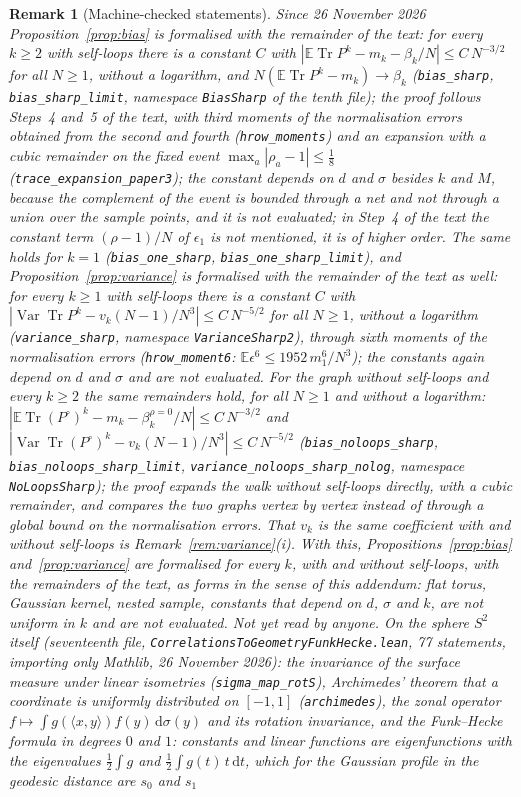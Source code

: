 \documentclass[11pt,a4paper]{article}
\theoremstyle{stmt}
\theoremstyle{defn}
\theoremstyle{rmk}
\newtheorem{remark}[theorem]{Remark}
\numberwithin{equation}{section}
\DeclareMathOperator{\Tr}{Tr}
\newcommand{\dd}{\mathrm{d}}
\begin{document}
{\begin{remark}[Machine-checked statements]
Since 26 November 2026 Proposition~\ref{prop:bias} is formalised with the remainder of the text: for every $k\ge2$ with self-loops there is a constant $C$ with $|\mathbb E\Tr P^k-m_k-\beta_k/N|\le C\,N^{-3/2}$ for all $N\ge1$, without a logarithm, and $N(\mathbb E\Tr P^k-m_k)\to\beta_k$ (\texttt{bias\_sharp}, \texttt{bias\_sharp\_limit}, namespace \texttt{BiasSharp} of the tenth file); the proof follows Steps~4 and~5 of the text, with third moments of the normalisation errors obtained from the second and fourth (\texttt{hrow\_moments}) and an expansion with a cubic remainder on the fixed event $\max_a|\rho_a-1|\le\frac18$ (\texttt{trace\_expansion\_paper3}); the constant depends on $d$ and $\sigma$ besides $k$ and $M$, because the complement of the event is bounded through a net and not through a union over the sample points, and it is not evaluated; in Step~4 of the text the constant term $(\rho-1)/N$ of $\epsilon_1$ is not mentioned, it is of higher order. The same holds for $k=1$ (\texttt{bias\_one\_sharp}, \texttt{bias\_one\_sharp\_limit}), and Proposition~\ref{prop:variance} is formalised with the remainder of the text as well: for every $k\ge1$ with self-loops there is a constant $C$ with $|\operatorname{Var}\Tr P^k-v_k(N-1)/N^3|\le C\,N^{-5/2}$ for all $N\ge1$, without a logarithm (\texttt{variance\_sharp}, namespace \texttt{VarianceSharp2}), through sixth moments of the normalisation errors (\texttt{hrow\_moment6}: $\mathbb E\epsilon^6\le1952\,m_1^6/N^3$); the constants again depend on $d$ and $\sigma$ and are not evaluated. For the graph without self-loops and every $k\ge2$ the same remainders hold, for all $N\ge1$ and without a logarithm: $|\mathbb E\Tr(P^\circ)^k-m_k-\beta_k^{\rho=0}/N|\le C\,N^{-3/2}$ and $|\operatorname{Var}\Tr(P^\circ)^k-v_k(N-1)/N^3|\le C\,N^{-5/2}$ (\texttt{bias\_noloops\_sharp}, \texttt{bias\_noloops\_sharp\_limit}, \texttt{variance\_noloops\_sharp\_nolog}, namespace \texttt{NoLoopsSharp}); the proof expands the walk without self-loops directly, with a cubic remainder, and compares the two graphs vertex by vertex instead of through a global bound on the normalisation errors. That $v_k$ is the same coefficient with and without self-loops is Remark~\ref{rem:variance}(i). With this, Propositions~\ref{prop:bias} and~\ref{prop:variance} are formalised for every $k$, with and without self-loops, with the remainders of the text, as forms in the sense of this addendum: flat torus, Gaussian kernel, nested sample, constants that depend on $d$, $\sigma$ and $k$, are not uniform in $k$ and are not evaluated. Not yet read by anyone. On the sphere $S^2$ itself (seventeenth file, \texttt{CorrelationsToGeometryFunkHecke.lean}, 77 statements, importing only Mathlib, 26 November 2026): the invariance of the surface measure under linear isometries (\texttt{sigma\_map\_rotS}), Archimedes' theorem that a coordinate is uniformly distributed on $[-1,1]$ (\texttt{archimedes}), the zonal operator $f\mapsto\int g(\langle x,y\rangle)f(y)\,\dd\sigma(y)$ and its rotation invariance, and the Funk--Hecke formula in degrees $0$ and $1$: constants and linear functions are eigenfunctions with the eigenvalues $\frac12\int g$ and $\frac12\int g(t)\,t\,\dd t$, which for the Gaussian profile in the geodesic distance are $s_0$ and $s_1$ 
\end{remark}}
\end{document}

